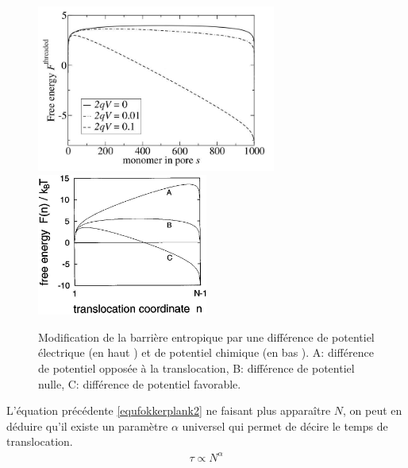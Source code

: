 \documentclass[a4paper,11pt]{article}
\begin{document}
\begin{figure}[H]
\begin{center}
\includegraphics[width=0.7\textwidth]{transelec.jpg} \includegraphics[width=0.5\textwidth]{transpotchim.jpg}

\caption{Modification de la barrière entropique par une différence de potentiel électrique (en haut \cite{these}) et de potentiel chimique (en bas \cite{Sung1996}). A: différence de potentiel opposée à la translocation, B: différence de potentiel nulle, C: différence de potentiel favorable.}
\label{energiebarrier}
\end{center}
\end{figure}

L'équation précédente \ref{equfokkerplank2} ne faisant plus apparaître $N$, on peut en déduire qu'il existe un paramètre $\alpha$ universel qui permet de décire le temps de translocation.
\begin{eqnarray}
\tau \propto N^\alpha
\label{tauunbiased}
\end{eqnarray}
\end{document}
